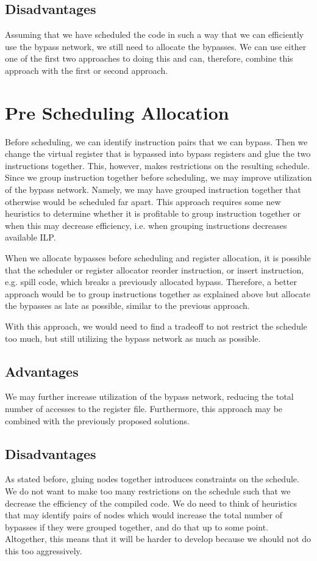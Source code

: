 \subsection{Disadvantages}
Assuming that we have scheduled the code in such a way that we can efficiently use the bypass network, we still need to allocate the bypasses. We can use either one of the first two approaches to doing this and can, therefore, combine this approach with the first or second approach.

\section{Pre Scheduling Allocation}\label{sec:pre_scheduling}
Before scheduling, we can identify instruction pairs that we can bypass. Then we change the virtual register that is bypassed into bypass registers and glue the two instructions together. This, however, makes restrictions on the resulting schedule. Since we group instruction together before scheduling, we may improve utilization of the bypass network. Namely, we may have grouped instruction together that otherwise would be scheduled far apart. This approach requires some new heuristics to determine whether it is profitable to group instruction together or when this may decrease efficiency, i.e. when grouping instructions decreases available ILP. 

When we allocate bypasses before scheduling and register allocation, it is possible that the scheduler or register allocator reorder instruction, or insert instruction, e.g. spill code, which breaks a previously allocated bypass. Therefore, a better approach would be to group instructions together as explained above but allocate the bypasses as late as possible, similar to the previous approach.

With this approach, we would need to find a tradeoff to not restrict the schedule too much, but still utilizing the bypass network as much as possible.   

\subsection{Advantages}
We may further increase utilization of the bypass network, reducing the total number of accesses to the register file. Furthermore, this approach may be combined with the previously proposed solutions. 

\subsection{Disadvantages}
As stated before, gluing nodes together introduces constraints on the schedule. We do not want to make too many restrictions on the schedule such that we decrease the efficiency of the compiled code. We do need to think of heuristics that may identify pairs of nodes which would increase the total number of bypasses if they were grouped together, and do that up to some point. Altogether, this means that it will be harder to develop because we should not do this too aggressively.

